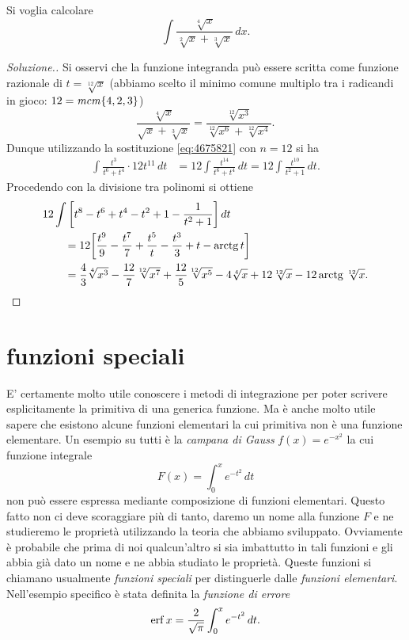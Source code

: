 \begin{example}
Si voglia calcolare
\[
  \int \frac{\sqrt[4]{x}}{\sqrt[2]{x} + \sqrt[3]{x}}\, dx.
\]
\end{example}
\begin{proof}[Soluzione.]
Si osservi che la funzione integranda può essere scritta
come funzione razionale di $t=\sqrt[12]{x}$ (abbiamo scelto
il minimo comune multiplo tra i radicandi in gioco: $12 = \mathit{mcm}{\left\{ 4,2,3 \right\}}$)
\[
  \frac{\sqrt[4]{x}}{\sqrt{x} + \sqrt[3]{x}}
  = \frac{\sqrt[12]{x^3}}{\sqrt[12]{x^6} + \sqrt[12]{x^4}}.
\]
Dunque utilizzando la sostituzione \eqref{eq:4675821} con $n=12$ si ha
\begin{align*}
\int \frac{t^3}{t^6 + t^4}\cdot 12 t^{11}\, dt
&= 12 \int \frac{t^{14}}{t^6+t^4}\, dt
 = 12 \int \frac{t^{10}}{t^2+1}\, dt.
\end{align*}
Procedendo con la divisione tra polinomi si ottiene
\begin{align*}
\MoveEqLeft{12 \int \Enclose{t^8 - t^6 + t^4 - t^2 + 1 - \frac{1}{t^2+1}}\, dt} \\
&= 12 \Enclose{\frac{t^9}{9} - \frac{t^7}{7} + \frac{t^5}{t} - \frac{t^3}{3} + t - \arctg t} \\
&= \frac 4 3 \sqrt[4]{x^3} - \frac{12}{7}\sqrt[12]{x^7}
+ \frac{12}{5}\sqrt[12]{x^5} - 4 \sqrt[4]{x} + 12 \sqrt[12]{x} - 12 \arctg \sqrt[12]{x}.
\end{align*}
\end{proof}

\section{funzioni speciali}

E' certamente molto utile conoscere i metodi di integrazione 
per poter scrivere esplicitamente la primitiva di una 
generica funzione. 
Ma è anche molto utile sapere che esistono alcune funzioni 
elementari la cui primitiva non è una funzione elementare.
Un esempio su tutti è la 
\emph{campana di Gauss}%
%
%
%
$f(x) = e^{-x^2}$ la cui funzione integrale 
\[
 F(x) = \int_0^x e^{-t^2}\, dt
\]
non può essere espressa mediante composizione di funzioni 
elementari.
Questo fatto non ci deve scoraggiare più di tanto,
daremo un nome alla funzione $F$ e ne studieremo le proprietà 
utilizzando la teoria che abbiamo sviluppato.
Ovviamente è probabile che prima di noi qualcun'altro 
si sia imbattutto in tali funzioni e gli abbia già dato 
un nome e ne abbia studiato le proprietà. 
Queste funzioni si chiamano usualmente \emph{funzioni speciali}
per distinguerle dalle \emph{funzioni elementari}.
%
%
%
%
Nell'esempio specifico è stata definita la 
\emph{funzione di errore}%
%
\[
  \operatorname{erf} x = \frac{2}{\sqrt \pi} \int_0^x e^{-t^2}\, dt.
\]

